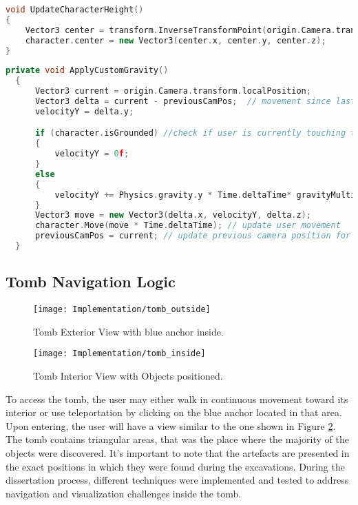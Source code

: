 \begin{lstlisting}[language=C++, caption={Recenter user position method.}, label={lst:recenter},float]
void UpdateCharacterHeight()
{
    Vector3 center = transform.InverseTransformPoint(origin.Camera.transform.position);
    character.center = new Vector3(center.x, center.y, center.z);
}
\end{lstlisting}


\begin{lstlisting}[language=C++, caption={Apply costum gravity method.}, label={lst:gravity},float]
  private void ApplyCustomGravity()
  {
      Vector3 current = origin.Camera.transform.localPosition;
      Vector3 delta = current - previousCamPos;  // movement since last frame
      velocityY = delta.y;

      if (character.isGrounded) //check if user is currently touching the ground plan
      {
          velocityY = 0f;
      }
      else
      {
          velocityY += Physics.gravity.y * Time.deltaTime* gravityMultiplier; // Apply custom gravity 
      }
      Vector3 move = new Vector3(delta.x, velocityY, delta.z);
      character.Move(move * Time.deltaTime); // update user movement
      previousCamPos = current; // update previous camera position for next frame
  }
\end{lstlisting}

\subsection{Tomb Navigation Logic}
\label{sec:tomb_logic}

 \begin{figure}[h!]
    \centering
    \texttt{[image: Implementation/tomb\_outside]}
    \caption{Tomb Exterior View with blue anchor inside.}
    \label{fig:tomb_outside}    
\end{figure}

 \begin{figure}[h!]
    \centering
    \texttt{[image: Implementation/tomb\_inside]}
    \caption{Tomb Interior View with Objects positioned.}
    \label{fig:tomb_inside}    
\end{figure}

To access the tomb, the user may either walk in continuous movement toward its interior or use teleportation by clicking on the blue anchor located in that area.
Upon entering, the user will have a view similar to the one shown in Figure \ref{fig:tomb_inside}.
The tomb contains triangular areas, that was the place where the majority of the objects were discovered. 
It's important to note that the artefacts are presented in the exact positions in which they were found during the excavations.
During the dissertation process, different techniques were implemented and tested to address navigation and visualization challenges inside the tomb.

